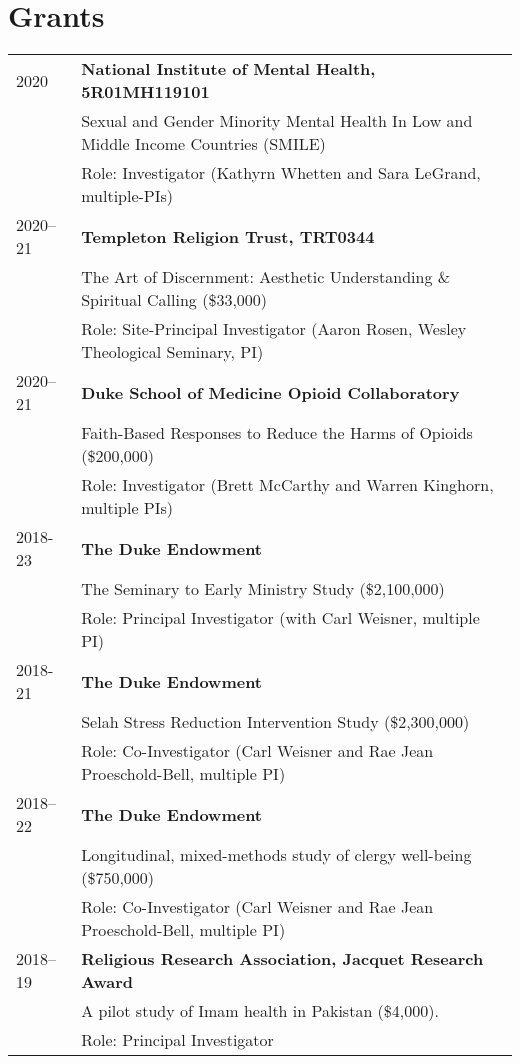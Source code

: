 \section*{Grants}
\begin{longtable}{p{} p{}}
2020 & \textbf{National Institute of Mental Health, 5R01MH119101} \\
& Sexual and Gender Minority Mental Health In Low and Middle Income Countries (SMILE) \\
& Role: Investigator (Kathyrn Whetten and Sara LeGrand, multiple-PIs)\\

2020--21 & \textbf{Templeton Religion Trust, TRT0344} \\
& The Art of Discernment: Aesthetic Understanding \& Spiritual Calling (\$33,000)\\
& Role: Site-Principal Investigator (Aaron Rosen, Wesley Theological Seminary, PI)\\

2020--21 & \textbf{Duke School of Medicine Opioid Collaboratory}\\
& Faith-Based Responses to Reduce the Harms of Opioids (\$200,000) \\
& Role: Investigator (Brett McCarthy and Warren Kinghorn, multiple PIs)\\

2018-23 & \textbf{The Duke Endowment}\\
& The Seminary to Early Ministry Study (\$2,100,000)\\
& Role: Principal Investigator (with Carl Weisner, multiple PI)\\

2018-21 & \textbf{The Duke Endowment}\\
& Selah Stress Reduction Intervention Study (\$2,300,000)\\
& Role: Co-Investigator (Carl Weisner and Rae Jean Proeschold-Bell, multiple PI)\\

2018--22 & \textbf{The Duke Endowment}\\
& Longitudinal, mixed-methods study of clergy well-being (\$750,000)\\
& Role: Co-Investigator (Carl Weisner and Rae Jean Proeschold-Bell, multiple PI)\\

2018--19 & \textbf{Religious Research Association, Jacquet Research Award}\\
& A pilot study of Imam health in Pakistan (\$4,000). \\
& Role: Principal Investigator\\


\end{longtable}
